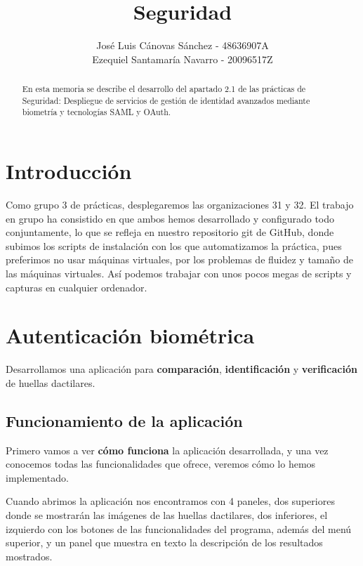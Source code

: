 \documentclass[]{article}
\title{Seguridad}
\author{José Luis Cánovas Sánchez - 48636907A\\Ezequiel Santamaría Navarro - 20096517Z}
\begin{document}
\maketitle

\begin{abstract}
En esta memoria se describe el desarrollo del apartado 2.1 de las prácticas de Seguridad: Despliegue de servicios de gestión de identidad avanzados mediante biometría y tecnologías SAML y OAuth.
\end{abstract}

\tableofcontents


\section{Introducción}

Como grupo 3 de prácticas, desplegaremos las organizaciones 31 y 32.
El trabajo en grupo ha consistido en que ambos hemos desarrollado y configurado todo conjuntamente, lo que se refleja en nuestro repositorio git de GitHub, donde subimos los scripts de instalación con los que automatizamos la práctica, pues preferimos no usar máquinas virtuales, por los problemas de fluidez y tamaño de las máquinas virtuales. Así podemos trabajar con unos pocos megas de scripts y capturas en cualquier ordenador.




\section{Autenticación biométrica}

Desarrollamos una aplicación para \textbf{comparación}, \textbf{identificación} y \textbf{verificación} de huellas dactilares.

\subsection{Funcionamiento de la aplicación}

Primero vamos a ver \textbf{cómo funciona} la aplicación desarrollada, y una vez conocemos todas las funcionalidades que ofrece, veremos cómo lo hemos implementado.

\hfil

Cuando abrimos la aplicación nos encontramos con 4 paneles, dos superiores donde se mostrarán las imágenes de las huellas dactilares, dos inferiores, el izquierdo con los botones de las funcionalidades del programa, además del menú superior, y un panel que muestra en texto la descripción de los resultados mostrados.
\end{document}
